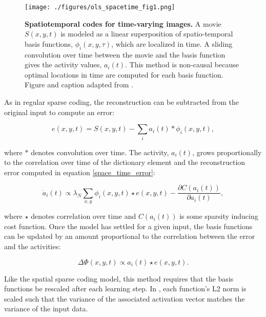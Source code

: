 \documentclass[smallextended]{svjour3}       %
\begin{document}
\begin{figure}
\centering
    \texttt{[image: ./figures/ols\_spacetime\_fig1.png]}
    \caption{\textbf{Spatiotemporal codes for time-varying images.} A movie $S(x,y,t)$ is modeled as a linear superposition of spatio-temporal basis functions, $\phi_i(x,y,\tau)$, which are localized in time. A sliding convolution over time between the movie and the basis function gives the activity values, $a_i(t)$. This method is non-causal because optimal locations in time are computed for each basis function. Figure and caption adapted from \cite{olshausen2003learning}.}
\label{ols_space_time}
\end{figure}

\noindent As in regular sparse coding, the reconstruction can be subtracted from the original input to compute an error:

\begin{equation}
    e(x,y,t) = S(x,y,t) - \sum_i a_i(t) \ast \phi_i(x,y,t),
\label{space_time_error}
\end{equation}

\noindent where $\ast$ denotes convolution over time. The activity, $a_i(t)$, grows proportionally to the correlation over time of the dictionary element and the reconstruction error computed in equation \ref{space_time_error}:

\begin{equation}
    \dot{a}_i(t) \propto
        \lambda_{N} \sum_{x,y} \phi_{i}(x,y,t) \star e(x,y,t) - \frac{\partial C(a_{i}(t))}{\partial a_{i}(t)},
\label{space_time_activity}
\end{equation}

\noindent where $\star$ denotes correlation over time and $C(a_{i}(t))$ is some sparsity inducing cost function. Once the model has settled for a given input, the basis functions can be updated by an amount proportional to the correlation between the error and the activities: 

\begin{equation}
    \Delta \Phi(x,y,t) \propto a_{i}(t) \star e(x,y,t).
\label{space_time_bases}
\end{equation}

\noindent Like the spatial sparse coding model, this method requires that the basis functions be rescaled after each learning step. In \cite{olshausen2003learning}, each function's L2 norm is scaled such that the variance of the associated activation vector matches the variance of the input data.\\
\end{document}
